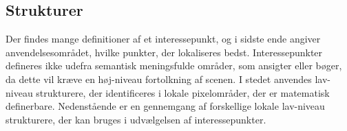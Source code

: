 \subsection{Strukturer}
Der findes mange definitioner af et interessepunkt, og i sidste ende angiver anvendelsesområdet, hvilke punkter, der lokaliseres bedst.
Interessepunkter defineres ikke udefra semantisk meningsfulde områder, som ansigter eller bøger, da dette vil kræve en høj-niveau fortolkning af scenen. I stedet anvendes lav-niveau strukturere, der identificeres i lokale pixelområder, der er matematisk definerbare. Nedenstående er en gennemgang af forskellige lokale lav-niveau strukturere, der kan bruges i udvælgelsen af interessepunkter.

